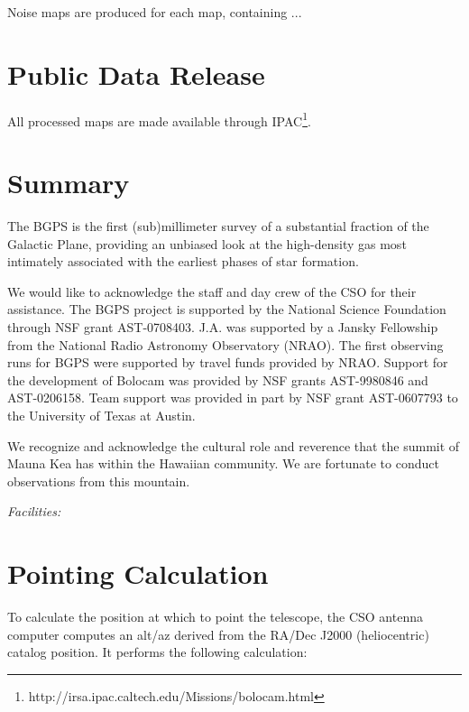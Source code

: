 \documentclass[12pt,preprint]{aastex}
\begin{document}
Noise maps are produced for each map, containing ...

\section{Public Data Release}

All processed maps are made available through
IPAC\footnote{http://irsa.ipac.caltech.edu/Missions/bolocam.html}.


\section{Summary}

The BGPS is the first (sub)millimeter survey of a substantial fraction
of the Galactic Plane, providing an unbiased look at the high-density
gas most intimately associated with the earliest phases of star
formation.

\acknowledgments

We would like to acknowledge the staff and day crew of the CSO for their
assistance. The BGPS project is supported by the National Science Foundation
through NSF grant AST-0708403. J.A. was supported by a Jansky Fellowship from
the National Radio Astronomy Observatory (NRAO). The first observing runs for
BGPS were supported by travel funds provided by NRAO. Support for the
development of Bolocam was provided by NSF grants AST-9980846 and AST-0206158.
Team support was provided in part by NSF grant AST-0607793 to the
University of Texas at Austin.

We recognize and acknowledge the cultural role and reverence that the
summit of Mauna Kea has within the Hawaiian community. We are
fortunate to conduct observations from this mountain.

{\it Facilities:} 

\appendix

\section{Pointing Calculation}
\label{sec:PointingCalculation}

To calculate the position at which to point the telescope, the CSO
antenna computer computes an alt/az derived from the RA/Dec J2000
(heliocentric) catalog position.  It performs the following
calculation:
\end{document}
